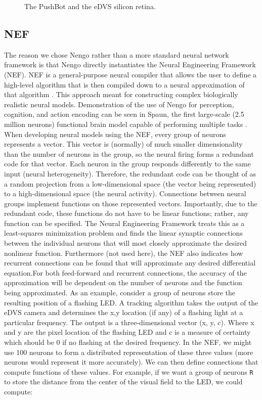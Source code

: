 \documentclass[conference]{IEEEtran}
\begin{document}
\begin{figure}[!t]
\centering
\caption{The PushBot and the eDVS silicon retina.}
\label{fig_sim}
\end{figure}

\subsection{NEF}
The reason we chose Nengo rather than a more standard neural network framework is that Nengo \cite{bekolay_nengo2014} directly instantiates the Neural Engineering Framework (NEF). NEF is a general-purpose neural compiler that allows the user to define a high-level algorithm that is then compiled down to a neural approximation of that algorithm \cite{eliasmith2004neural}. This approach meant for constructing complex biologically realistic neural models. Demonstration of the use of Nengo for perception, cognition, and action encoding can be seen in Spaun, the first large-scale (2.5 million neurons) functional brain model capable of performing multiple tasks  \cite{eliasmith_largescale_2012}. When developing neural models using the NEF, every group of neurons represents a vector. This vector is (normally) of much smaller dimensionality than the number of neurons in the group, so the neural firing forms a redundant code for that vector. Each neuron in the group responds differently to the same input (neural heterogeneity). Therefore, the redundant code can be thought of as a random projection from a low-dimensional space (the vector being represented) to a high-dimensional space (the neural activity). Connections between neural groups implement functions on those represented vectors. Importantly, due to the redundant code, these functions do not have to be linear functions; rather, any function can be specified. The Neural Engineering Framework treats this as a least-squares minimization problem and finds the linear synaptic connections between the individual neurons that will most closely approximate the desired nonlinear function. Furthermore (not used here), the NEF also indicates how recurrent connections can be found that will approximate any desired differential equation.For both feed-forward and recurrent connections, the accuracy of the approximation will be dependent on the number of neurons and the function being approximated. As an example, consider a group of neurons store the resulting position of a flashing LED. A tracking algorithm takes the output of the eDVS camera and determines the x,y location (if any) of a flashing light at a particular frequency. The output is a three-dimensional vector (x, y, c). Where x and y are the pixel location of the flashing LED and c is a measure of certainty which should be 0 if no flashing at the desired frequency. In the NEF, we might use 100 neurons to form a distributed representation of these three values (more neurons would represent it more accurately). We can then define connections that compute functions of these values. For example, if we want a group of neurons \texttt{R} to store the distance from the center of the visual field to the LED, we could compute: 
\end{document}
